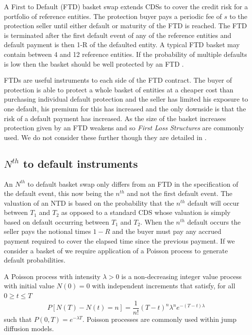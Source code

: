 A First to Default (FTD) basket swap extends CDSs to cover the credit risk for a portfolio of reference entities.  The protection buyer pays a periodic fee of $s$ to the protection seller until either default or maturity of the FTD is reached.  The FTD is terminated after the first default event of any of the reference entities and default payment is then 1-R of the defaulted entity. A typical FTD basket may contain between 4 and 12 reference entities. If the probability of multiple defaults is low then the basket should be well protected by an FTD \cite{Sch2003}. 

FTDs are useful instruments to each side of the FTD contract.  The buyer of protection is able to protect a whole basket of entities at a cheaper cost than purchasing individual default protection and the seller has limited his exposure to one default, his premium for this has increased and the only downside is that the risk of a default payment has increased.
As the size of the basket increases protection given by an FTD weakens and so { \em First Loss Structures } are commonly used.  We do not consider these further though they are detailed in \cite{Sch2003}.

\subsection{$N^{th}$ to default instruments}\label{subsec:NTDs}

An $N^{th}$ to default basket swap only differs from an FTD in the specification of the default event, this now being the $n^{th}$ and not the first default event. The valuation of an NTD is based on the probability that the $n^{th}$ default will occur between $T_1$ and $T_2$ as opposed to a standard CDS whose valuation is simply based on default occurring between $T_1$ and $T_2$.  When the $n^{th}$ default occurs the seller pays the notional times $1-R$ and the buyer must pay any accrued payment required to cover the elapsed time since the previous payment.  If we consider a basket of we require application of a Poisson process to generate default probabilities.


\begin{definition}\label{def:poisson}
\begin{rm}
A Poisson process with intensity $\lambda > 0$ is a non-decreasing integer value process with initial value $N(0) = 0$ with independent increments that satisfy, for all $0 \geq t \leq T$
\[
	P[N(T) - N(t) = n] = \frac{1}{n!} (T-t)^n \lambda^n e^{-(T-t)\lambda}
\] 
such that $P(0,T) = e^{-\lambda T}$.  Poisson processes are commonly used within jump diffusion models.
\end{rm}
\end{definition}

